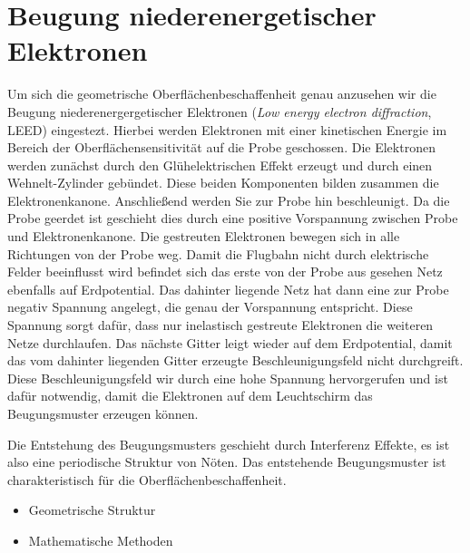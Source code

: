     \section{Beugung niederenergetischer Elektronen} \label{sec:LEED}
    Um sich die geometrische Oberflächenbeschaffenheit genau anzusehen wir die Beugung niederenergergetischer Elektronen (\textit{Low energy electron diffraction}, LEED) eingestezt.
    Hierbei werden Elektronen mit einer kinetischen Energie im Bereich der Oberflächensensitivität auf die Probe geschossen.
    Die Elektronen werden zunächst durch den Glühelektrischen Effekt erzeugt und durch einen Wehnelt-Zylinder gebündet.
    Diese beiden Komponenten bilden zusammen die Elektronenkanone.
    Anschließend werden Sie zur Probe hin beschleunigt.
    Da die Probe geerdet ist geschieht dies durch eine positive Vorspannung zwischen Probe und Elektronenkanone.
    Die gestreuten Elektronen bewegen sich in alle Richtungen von der Probe weg.
    Damit die Flugbahn nicht durch elektrische Felder beeinflusst wird befindet sich das erste von der Probe aus gesehen Netz ebenfalls auf Erdpotential.
    Das dahinter liegende Netz hat dann eine zur Probe negativ Spannung angelegt, die genau der Vorspannung entspricht.
    Diese Spannung sorgt dafür, dass nur inelastisch gestreute Elektronen die weiteren Netze durchlaufen.
    Das nächste Gitter leigt wieder auf dem Erdpotential, damit das vom dahinter liegenden Gitter erzeugte Beschleunigungsfeld nicht durchgreift.
    Diese Beschleunigungsfeld wir durch eine hohe Spannung hervorgerufen und ist dafür notwendig, damit die Elektronen auf dem Leuchtschirm das Beugungsmuster erzeugen können.

    Die Entstehung des Beugungsmusters geschieht durch Interferenz Effekte, es ist also eine periodische Struktur von Nöten.
    Das entstehende Beugungsmuster ist charakteristisch für die Oberflächenbeschaffenheit.
        \begin{itemize}
            \item Geometrische Struktur
            \item Mathematische Methoden
        \end{itemize}

    
